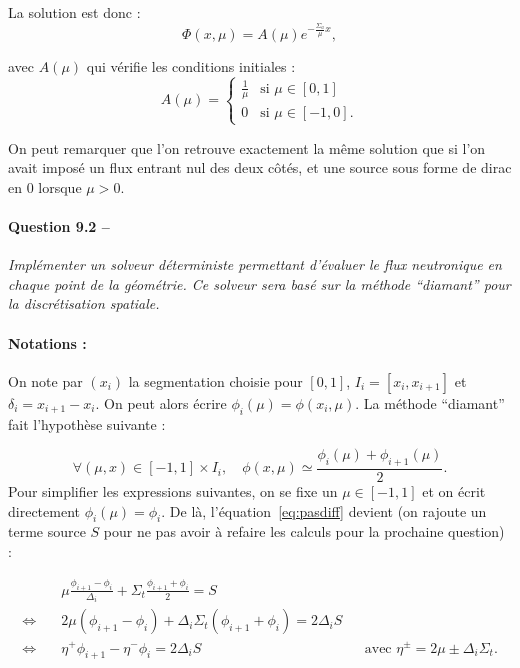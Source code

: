 \documentclass[11pt,a4paper]{article}
\newcommand{\question}[2]{\paragraph{Question #1 --}\hspace{-7pt}\textit{#2} \\}
\begin{document}
La solution est donc :
\begin{equation}
 \Phi(x, \mu) = A(\mu) e^{-\frac{\Sigma_a}{\mu}x} ,
\end{equation}

avec $A(\mu)$ qui vérifie les conditions initiales :
\begin{equation}
 A(\mu) = 
 \begin{cases}
  \frac{1}{\mu} & \text{si } \mu \in [0,1] \\
  0             & \text{si } \mu \in [-1,0] .
 \end{cases}
\end{equation}

On peut remarquer que l'on retrouve exactement la même solution que si l'on avait imposé un flux entrant nul des deux côtés, et une source sous forme de dirac en 0 lorsque $\mu>0$.

\question{9.2}{Implémenter un solveur déterministe permettant d'évaluer le flux neutronique en chaque point de la géométrie. Ce solveur sera basé sur la méthode ``diamant'' pour la discrétisation spatiale.} 

\paragraph{Notations :} On note par $(x_i)$ la segmentation choisie pour $[0,1]$, $I_i = [x_i,x_{i+1}]$ et $\delta_i = x_{i+1} - x_i$.
On peut alors écrire $\phi_i( \mu) = \phi(x_i,\mu)$.
La méthode ``diamant'' fait l'hypothèse suivante :

\begin{equation}
 \forall (\mu,x) \in [-1,1]\times I_i, \quad \phi(x,\mu) \simeq \frac{\phi_i(\mu) + \phi_{i+1}(\mu)}{2} .
\end{equation}
Pour simplifier les expressions suivantes, on se fixe un $\mu \in  [-1,1]$ et on écrit directement $\phi_i(\mu) = \phi_i$.
De là, l'équation~\ref{eq:pasdiff} devient (on rajoute un terme source $S$ pour ne pas avoir à refaire les calculs pour la prochaine question) :

\begin{equation}
\begin{align}
 & \mu \frac{\phi_{i+1}-\phi_i}{\Delta_i} + \Sigma_t \frac{\phi_{i+1}+\phi_i}{2} = S\\
 \Leftrightarrow \quad & 2 \mu (\phi_{i+1}- \phi_i) + \Delta_i \Sigma_t (\phi_{i+1}+\phi_i) = 2 \Delta_i S\\
 \Leftrightarrow \quad & \eta^+ \phi_{i+1} - \eta^- \phi_i = 2 \Delta_i S &&  \text{avec } \eta^{\pm} = 2 \mu \pm \Delta_i \Sigma_t .
 \end{align}
\end{equation}
\end{document}
